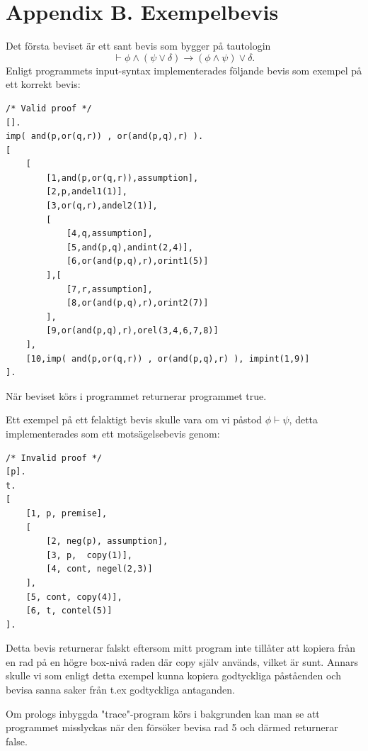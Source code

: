 \documentclass[a4paper]{article}
\begin{document}
\section{Appendix B. Exempelbevis}
Det första beviset är ett sant bevis som bygger på tautologin 
\begin{equation}
\vdash \phi \wedge (\psi \vee \delta) \rightarrow (\phi \wedge \psi) \vee \delta.
\end{equation}
Enligt programmets input-syntax implementerades följande bevis som exempel på ett korrekt bevis:
\begin{verbatim}
/* Valid proof */
[].
imp( and(p,or(q,r)) , or(and(p,q),r) ).
[
	[
		[1,and(p,or(q,r)),assumption],
		[2,p,andel1(1)],
		[3,or(q,r),andel2(1)],
		[	
			[4,q,assumption],
			[5,and(p,q),andint(2,4)],
			[6,or(and(p,q),r),orint1(5)]
		],[
			[7,r,assumption],
			[8,or(and(p,q),r),orint2(7)]
		],
		[9,or(and(p,q),r),orel(3,4,6,7,8)]
	],
	[10,imp( and(p,or(q,r)) , or(and(p,q),r) ), impint(1,9)]	
].
\end{verbatim}
När beviset körs i programmet returnerar programmet true.

Ett exempel på ett felaktigt bevis skulle vara om vi påstod $\phi \vdash \psi$,
detta implementerades som ett motsägelsebevis genom:
\begin{verbatim}
/* Invalid proof */
[p].
t.
[	
	[1, p, premise],
	[
		[2, neg(p), assumption],
		[3, p,	copy(1)],
		[4, cont, negel(2,3)]
	],
	[5, cont, copy(4)],
	[6, t, contel(5)]
].
\end{verbatim}
Detta bevis returnerar falskt eftersom mitt program inte tillåter att kopiera från en rad på en högre box-nivå raden där copy själv används, vilket är sunt. Annars skulle vi som enligt detta exempel kunna kopiera godtyckliga påståenden och bevisa sanna saker från t.ex godtyckliga antaganden.

Om prologs inbyggda "trace"-program körs i bakgrunden kan man se att programmet misslyckas när den försöker bevisa rad 5 och därmed returnerar false.
\end{document}
